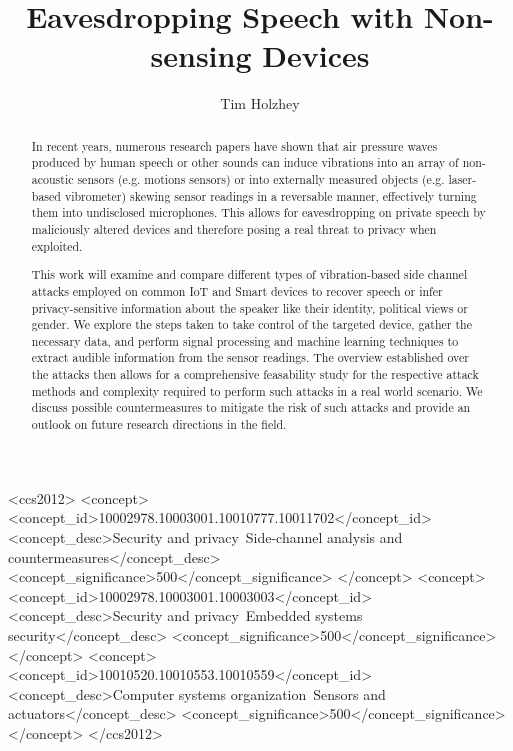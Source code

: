 \documentclass[sigconf, nonacm]{acmart}
\begin{document}
\title{Eavesdropping Speech with Non-sensing Devices}

\author{Tim Holzhey}

\begin{abstract}
  In recent years, numerous research papers have shown that air pressure waves produced by human speech or other sounds can induce vibrations into an array of non-acoustic sensors (e.g. motions sensors) or into externally measured objects (e.g. laser-based vibrometer) skewing sensor readings in a reversable manner, effectively turning them into undisclosed microphones.
  This allows for eavesdropping on private speech by maliciously altered devices and therefore posing a real threat to privacy when exploited.
  
  This work will examine and compare different types of vibration-based side channel attacks employed on common IoT and Smart devices to recover speech or infer privacy-sensitive information about the speaker like their identity, political views or gender.
  We explore the steps taken to take control of the targeted device, gather the necessary data, and perform signal processing and machine learning techniques to extract audible information from the sensor readings.
  The overview established over the attacks then allows for a comprehensive feasability study for the respective attack methods and complexity required to perform such attacks in a real world scenario. 
  We discuss possible countermeasures to mitigate the risk of such attacks and provide an outlook on future research directions in the field.
\end{abstract}

\begin{CCSXML}
  <ccs2012>
  <concept>
  <concept_id>10002978.10003001.10010777.10011702</concept_id>
  <concept_desc>Security and privacy~Side-channel analysis and countermeasures</concept_desc>
  <concept_significance>500</concept_significance>
  </concept>
  <concept>
  <concept_id>10002978.10003001.10003003</concept_id>
  <concept_desc>Security and privacy~Embedded systems security</concept_desc>
  <concept_significance>500</concept_significance>
  </concept>
  <concept>
  <concept_id>10010520.10010553.10010559</concept_id>
  <concept_desc>Computer systems organization~Sensors and actuators</concept_desc>
  <concept_significance>500</concept_significance>
  </concept>
  </ccs2012>
\end{CCSXML}
\end{document}
